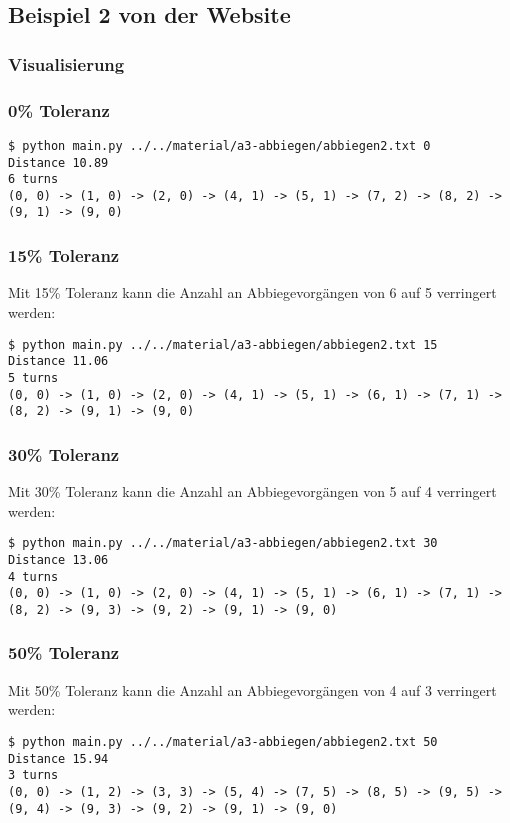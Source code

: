 \documentclass[a4paper,10pt,ngerman]{scrartcl}
\begin{document}
\subsection{Beispiel 2 von der Website}
\subsubsection{Visualisierung}


\subsubsection{0\% Toleranz}
\begin{lstlisting}
$ python main.py ../../material/a3-abbiegen/abbiegen2.txt 0
Distance 10.89
6 turns
(0, 0) -> (1, 0) -> (2, 0) -> (4, 1) -> (5, 1) -> (7, 2) -> (8, 2) -> (9, 1) -> (9, 0)
\end{lstlisting}

\subsubsection{15\% Toleranz}
Mit 15\% Toleranz kann die Anzahl an Abbiegevorgängen von 6 auf 5 verringert werden:
\begin{lstlisting}
$ python main.py ../../material/a3-abbiegen/abbiegen2.txt 15
Distance 11.06
5 turns
(0, 0) -> (1, 0) -> (2, 0) -> (4, 1) -> (5, 1) -> (6, 1) -> (7, 1) -> (8, 2) -> (9, 1) -> (9, 0)
\end{lstlisting}

\subsubsection{30\% Toleranz}
Mit 30\% Toleranz kann die Anzahl an Abbiegevorgängen von 5 auf 4 verringert werden:
\begin{lstlisting}
$ python main.py ../../material/a3-abbiegen/abbiegen2.txt 30
Distance 13.06
4 turns
(0, 0) -> (1, 0) -> (2, 0) -> (4, 1) -> (5, 1) -> (6, 1) -> (7, 1) -> (8, 2) -> (9, 3) -> (9, 2) -> (9, 1) -> (9, 0)
\end{lstlisting}

\subsubsection{50\% Toleranz}
Mit 50\% Toleranz kann die Anzahl an Abbiegevorgängen von 4 auf 3 verringert werden:
\begin{lstlisting}
$ python main.py ../../material/a3-abbiegen/abbiegen2.txt 50
Distance 15.94
3 turns
(0, 0) -> (1, 2) -> (3, 3) -> (5, 4) -> (7, 5) -> (8, 5) -> (9, 5) -> (9, 4) -> (9, 3) -> (9, 2) -> (9, 1) -> (9, 0)
\end{lstlisting}
\end{document}
